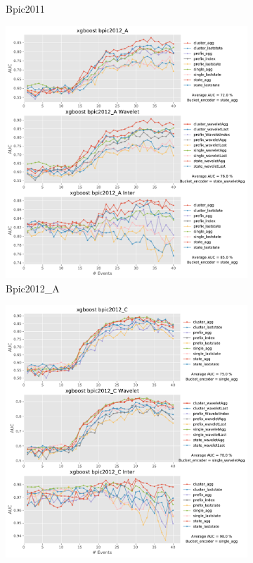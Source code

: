 \documentclass[twoside,11pt]{Latex/Classes/PhDthesisPSnPDF}
\begin{document}
\begin{figure}[!htbp]
\begin{subfigure}{0.48\textwidth}
		\caption{Bpic2011} \label{fig:b11i}
	\end{subfigure}	
	\medskip
	\begin{subfigure}{0.48\textwidth}
		\includegraphics[width=\linewidth]{images/inter/xgboost/bpic2012_A.pdf}
		\caption{Bpic2012\_A} \label{fig:b12ai}
	\end{subfigure}\hspace*{\fill}
	\begin{subfigure}{0.48\textwidth}
		\includegraphics[width=\linewidth]{images/inter/xgboost/bpic2012_C.pdf}

\end{subfigure}
\end{figure}
\end{document}
